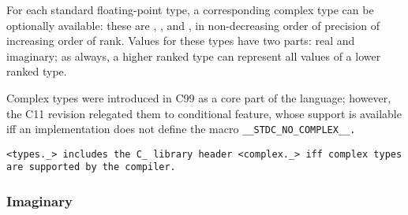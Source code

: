 \def\Subsubsection#1{\subsubsection{#1}}

For each standard floating-point type,
a corresponding complex type can be optionally available:
these are , , and ,
in non-decreasing order of precision of increasing order of rank.
Values for these types have two parts: real and imaginary;
as always, a higher ranked type can represent all values of a lower ranked type.

Complex types were introduced in C99 as a core part of the language;
however, the C11 revision relegated them to conditional feature,
whose support is available iff an implementation
does not define the macro \tt{__STDC_NO_COMPLEX__}.

\note \tt{<types._>} includes the C\_ library header
\tt{<complex._>} iff complex types are supported by the compiler.

\Subsubsection{Imaginary}
